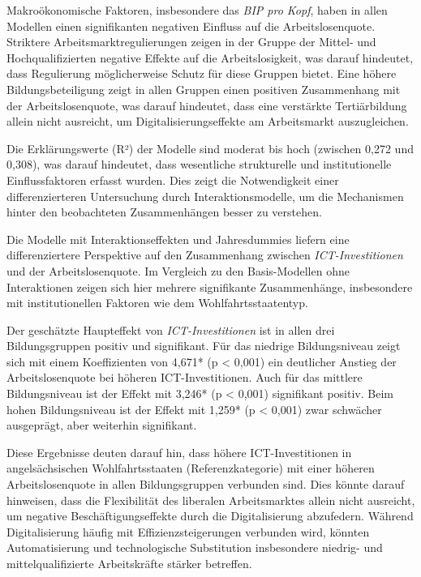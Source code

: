 Makroökonomische Faktoren, insbesondere das \textit{\ac{BIP} pro Kopf}, haben in allen Modellen 
einen signifikanten negativen Einfluss auf die Arbeitslosenquote. Striktere Arbeitsmarktregulierungen  
zeigen in der Gruppe der Mittel- und Hochqualifizierten negative Effekte auf die Arbeitslosigkeit, 
was darauf hindeutet, dass Regulierung möglicherweise Schutz für diese Gruppen bietet. Eine höhere 
Bildungsbeteiligung zeigt in allen Gruppen einen positiven Zusammenhang mit der Arbeitslosenquote, 
was darauf hindeutet, dass eine verstärkte Tertiärbildung allein nicht ausreicht, um 
Digitalisierungseffekte am Arbeitsmarkt auszugleichen.

Die Erklärungswerte (R²) der Modelle sind moderat bis hoch (zwischen 0,272 und 0,308), was darauf 
hindeutet, dass wesentliche strukturelle und institutionelle Einflussfaktoren erfasst wurden. Dies 
zeigt die Notwendigkeit einer differenzierteren Untersuchung durch Interaktionsmodelle, um die 
Mechanismen hinter den beobachteten Zusammenhängen besser zu verstehen.



Die Modelle mit Interaktionseffekten und Jahresdummies liefern eine differenziertere Perspektive 
auf den Zusammenhang zwischen \textit{\ac{ICT}-Investitionen} und der Arbeitslosenquote. Im 
Vergleich zu den Basis-Modellen ohne Interaktionen zeigen sich hier mehrere signifikante 
Zusammenhänge, insbesondere mit institutionellen Faktoren wie dem Wohlfahrtsstaatentyp.

Der geschätzte Haupteffekt von \textit{\ac{ICT}-Investitionen} ist in allen drei 
Bildungsgruppen positiv und signifikant. Für das niedrige Bildungsniveau zeigt sich mit einem 
Koeffizienten von 4,671* (p < 0,001) ein deutlicher Anstieg der Arbeitslosenquote bei 
höheren ICT-Investitionen. Auch für das mittlere Bildungsniveau ist der Effekt mit 
3,246* (p < 0,001) signifikant positiv. Beim hohen Bildungsniveau ist der Effekt mit 
1,259* (p < 0,001) zwar schwächer ausgeprägt, aber weiterhin signifikant.

Diese Ergebnisse deuten darauf hin, dass höhere ICT-Investitionen in angelsächsischen 
Wohlfahrtsstaaten (Referenzkategorie) mit einer höheren Arbeitslosenquote in allen 
Bildungsgruppen verbunden sind. Dies könnte darauf hinweisen, dass die Flexibilität des 
liberalen Arbeitsmarktes allein nicht ausreicht, um negative Beschäftigungseffekte durch die 
Digitalisierung abzufedern. Während Digitalisierung häufig mit Effizienzsteigerungen verbunden 
wird, könnten Automatisierung und technologische Substitution insbesondere niedrig- und 
mittelqualifizierte Arbeitskräfte stärker betreffen.

